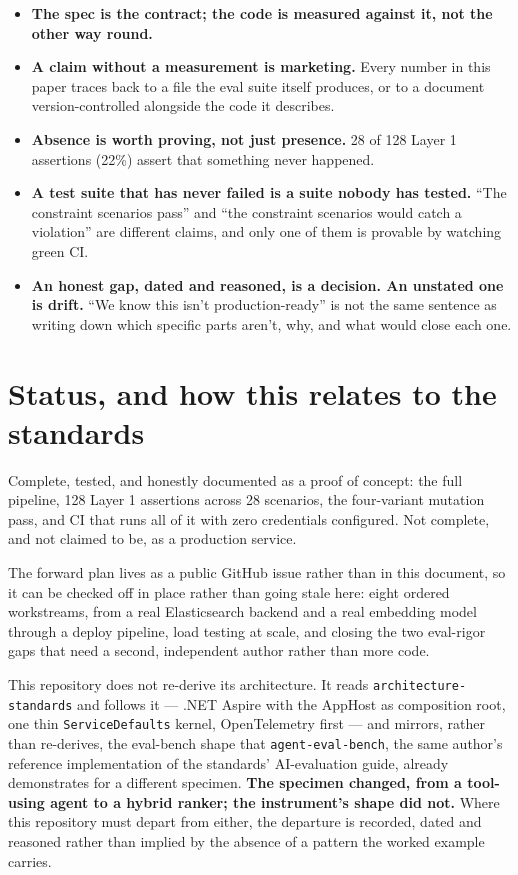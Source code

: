 \documentclass[11pt,a4paper]{article}
\newcommand{\finding}[1]{{\color{primaryblue}\textbf{#1}}}
\begin{document}
\begin{itemize}[leftmargin=1.4em]
  \item \textbf{The spec is the contract; the code is measured against it, not
        the other way round.}
  \item \textbf{A claim without a measurement is marketing.} Every number in
        this paper traces back to a file the eval suite itself produces, or to
        a document version-controlled alongside the code it describes.
  \item \textbf{Absence is worth proving, not just presence.} 28 of 128
        Layer 1 assertions (22\%) assert that something never happened.
  \item \textbf{A test suite that has never failed is a suite nobody has
        tested.} ``The constraint scenarios pass'' and ``the constraint
        scenarios would catch a violation'' are different claims, and only one
        of them is provable by watching green CI.
  \item \textbf{An honest gap, dated and reasoned, is a decision. An unstated
        one is drift.} ``We know this isn't production-ready'' is not the same
        sentence as writing down which specific parts aren't, why, and what
        would close each one.
\end{itemize}

\section{Status, and how this relates to the standards}

Complete, tested, and honestly documented as a proof of concept: the full
pipeline, 128 Layer 1 assertions across 28 scenarios, the four-variant
mutation pass, and CI that runs all of it with zero credentials configured.
Not complete, and not claimed to be, as a production service.

The forward plan lives as a public GitHub issue rather than in this document,
so it can be checked off in place rather than going stale here: eight ordered
workstreams, from a real Elasticsearch backend and a real embedding model
through a deploy pipeline, load testing at scale, and closing the two
eval-rigor gaps that need a second, independent author rather than more code.

This repository does not re-derive its architecture. It reads
\texttt{architecture-standards} and follows it --- .NET Aspire with the
AppHost as composition root, one thin \texttt{ServiceDefaults} kernel,
OpenTelemetry first --- and mirrors, rather than re-derives, the eval-bench
shape that \texttt{agent-eval-bench}, the same author's reference
implementation of the standards' AI-evaluation guide, already demonstrates for
a different specimen. \finding{The specimen changed, from a tool-using agent
to a hybrid ranker; the instrument's shape did not.} Where this repository
must depart from either, the departure is recorded, dated and reasoned rather
than implied by the absence of a pattern the worked example carries.
\end{document}
